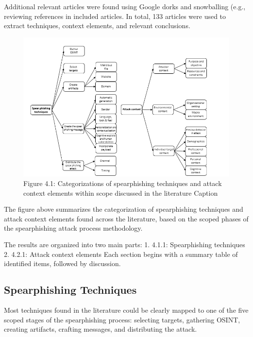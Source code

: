 Additional relevant articles were found using Google dorks and snowballing (e.g., reviewing references in included articles. In total, 133 articles were used to extract techniques, context elements, and relevant conclusions.
\begin{figure}
    \includegraphics[width=0.75\linewidth]{spearphishing-techniques.png}
    \caption{Figure 4.1: Categorizations of spearphishing techniques and attack context elements within scope discussed in the literature Caption}
    \label{fig:placeholder}
\end{figure}
The figure above summarizes the categorization of spearphishing techniques and attack context elements found across the literature, based on the scoped phases of the spearphishing attack process methodology.

The results are organized into two main parts:
1. 4.1.1: Spearphishing techniques
2. 4.2.1: Attack context elements
Each section begins with a summary table of identified items, followed by discussion.

\subsection{Spearphishing Techniques}
Most techniques found in the literature could be clearly mapped to one of the five scoped stages of the spearphishing process: selecting targets, gathering OSINT, creating artifacts, crafting messages, and distributing the attack.

